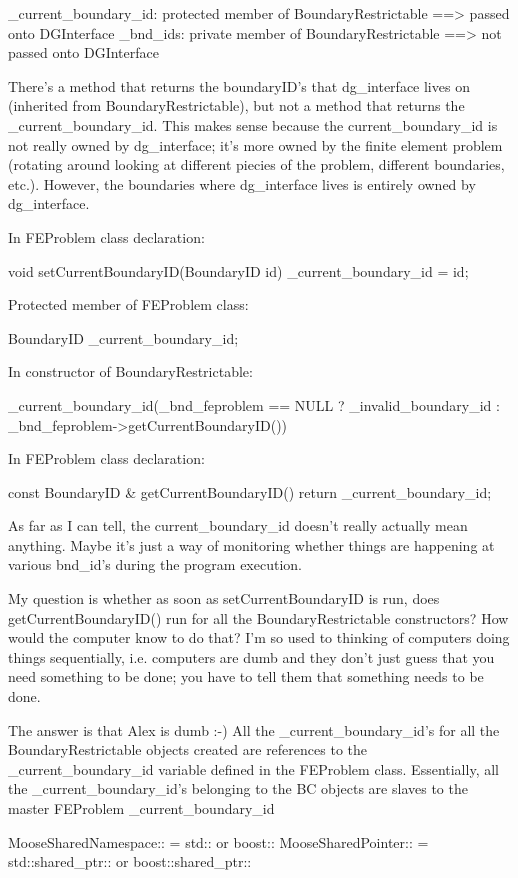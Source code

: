 {_current_boundary_id: protected member of BoundaryRestrictable ==> passed onto DGInterface
_bnd_ids: private member of BoundaryRestrictable ==> not passed onto DGInterface

There's a method that returns the boundaryID's that dg_interface lives on (inherited from BoundaryRestrictable), but not a method that returns the _current_boundary_id. This makes sense because the current_boundary_id is not really owned by dg_interface; it's more owned by the finite element problem (rotating around looking at different piecies of the problem, different boundaries, etc.). However, the boundaries where dg_interface lives is entirely owned by dg_interface.

In FEProblem class declaration:

  void setCurrentBoundaryID(BoundaryID id){ _current_boundary_id = id; }

Protected member of FEProblem class:

  BoundaryID _current_boundary_id;

In constructor of BoundaryRestrictable:

    _current_boundary_id(_bnd_feproblem == NULL ? _invalid_boundary_id : _bnd_feproblem->getCurrentBoundaryID())

In FEProblem class declaration:

  const BoundaryID & getCurrentBoundaryID(){ return _current_boundary_id; }

As far as I can tell, the current_boundary_id doesn't really actually mean anything. Maybe it's just a way of monitoring whether things are happening at various bnd_id's during the program execution.

My question is whether as soon as setCurrentBoundaryID is run, does getCurrentBoundaryID() run for all the BoundaryRestrictable constructors? How would the computer know to do that? I'm so used to thinking of computers doing things sequentially, i.e. computers are dumb and they don't just guess that you need something to be done; you have to tell them that something needs to be done.

The answer is that Alex is dumb :-) All the _current_boundary_id's for all the BoundaryRestrictable objects created are references to the _current_boundary_id variable defined in the FEProblem class. Essentially, all the _current_boundary_id's belonging to the BC objects are slaves to the master FEProblem _current_boundary_id

MooseSharedNamespace:: = std:: or boost::
MooseSharedPointer:: = std::shared_ptr:: or boost::shared_ptr::

}
